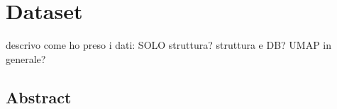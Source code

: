 
\chapter{Dataset}
\label{chap:2_dataset}
	\graphicspath{{Chapter2/}}

descrivo come ho preso i dati: SOLO struttura? struttura e DB? UMAP in generale?
\section{Abstract}










